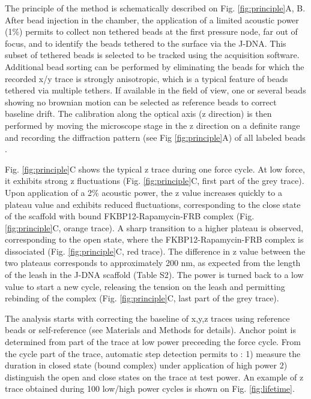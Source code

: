 \documentclass{biophys-new}
\begin{document}
The principle of the method is schematically described on Fig. \ref{fig:principle}A, B. After bead injection in the chamber, the application of a limited acoustic power (1\%) permits to collect non tethered beads at the first pressure node, far out of focus, and to identify the beads tethered to the surface via the J-DNA. This subset of tethered beads is selected to be tracked using the acquisition software. Additional bead sorting can be performed by eliminating the beads for which the recorded x/y trace is strongly anisotropic, which is a typical feature of beads tethered via multiple tethers. If available in the field of view, one or several beads showing no brownian motion can be selected as reference beads to correct baseline drift. The calibration along the optical axis (z direction) is then performed by moving the microscope stage in the z direction on a definite range and recording the diffraction pattern (see Fig \ref{fig:principle}A) of all labeled beads \cite{gosse2002, sitters2015}. 

Fig. \ref{fig:principle}C shows the typical z trace during one force cycle. At low force, it exhibits strong z fluctuations (Fig. \ref{fig:principle}C, first part of the grey trace). Upon application of a 2\% acoustic power, the z value increases quickly to a plateau value and exhibits reduced fluctuations, corresponding to the close state of the scaffold with bound FKBP12-Rapamycin-FRB complex (Fig. \ref{fig:principle}C, orange trace). A sharp transition to a higher plateau is observed, corresponding to the open state, where the FKBP12-Rapamycin-FRB complex is dissociated (Fig. \ref{fig:principle}C, red trace). The difference in z value between the two plateaus corresponds to approximately 200 nm, as expected from the length of the leash in the J-DNA scaffold (Table S2). The power is turned back to a low value to start a new cycle, releasing the tension on the leash and permitting rebinding of the complex (Fig. \ref{fig:principle}C, last part of the grey trace).

The analysis starts with correcting the baseline of x,y,z traces using reference beads or self-reference (see Materials and Methods for details). Anchor point is determined from part of the trace at low power preceeding the force cycle. From the cycle part of the trace, automatic step detection permits to : 1) measure the duration in closed state (bound complex) under application of high power 2) distinguish the open and close states on the trace at test power. An example of z trace obtained during 100 low/high power cycles is shown on Fig. \ref{fig:lifetime}.
\end{document}
